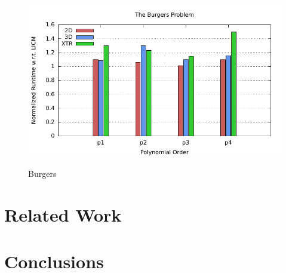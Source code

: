\documentclass[conference]{IEEEtran}
\begin{document}
\begin{figure}[h]
\centerline{\includegraphics[scale=0.7]{Pictures/burgers-normalized.pdf}
\label{fig_first_case}}
\caption{Burgers}
\end{figure}


\section{Related Work}


\section{Conclusions}

\end{document}
